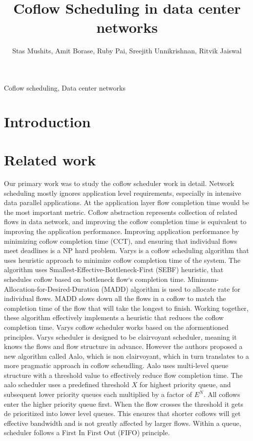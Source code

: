 \documentclass[conference]{IEEEtran}
\title{Coflow Scheduling in data center networks}
\begin{document}
\author{ Stas Mushits, Amit Borase, Ruby Pai, Sreejith Unnikrishnan, Ritvik Jaiswal }

\maketitle


\begin{abstract}
\blindtext[1]
\end{abstract}

\begin{IEEEkeywords}
Coflow scheduling, Data center networks
\end{IEEEkeywords}

\section{Introduction}


\section{Related work}

Our primary work was to study the coflow scheduler work in detail. Network scheduling mostly ignores application level requirements, especially in intensive data parallel applications. At the application layer flow completion time would be the most important metric. Coflow abstraction represents collection of related flows in data network, and improving the coflow completion time is equivalent to improving the application performance. Improving application performance by minimizing coflow completion time (CCT), and ensuring that individual flows meet deadlines is a NP hard problem. Varys is a coflow scheduling algorithm that uses heuristic approach to minimize coflow completion time of the system. The algorithm uses Smallest-Effective-Bottleneck-First (SEBF) heuristic, that schedules coflow based on bottleneck flow`s completion time. Minimum-Allocation-for-Desired-Duration (MADD) algorithm is used to allocate rate for individual flows. MADD slows down all the flows in a coflow to match the completion time of the flow that will take the longest to finish. Working together, these algorithm effectively implements a heuristic that reduces the coflow completion time. Varys coflow scheduler works based on the aformentioned principles. Varys scheduler is designed to be clairvoyant scheduler, meaning it knows the flows and flow structure in advance. However the authors proposed a new algorithm called Aalo, which is non clairvoyant, which in turn translates to a more pragmatic approach in coflow scheudling. Aalo uses multi-level queue structure with a threshold value to effectively reduce flow completion time. The aalo scheduler uses a predefined threshold \(X\) for highest priority queue, and subsequent lower priority queues each multiplied by a factor of \(E^N\). All coflows enter the higher priority queue first. When the flow crosses the threshold it gets de prioritized into lower level queues. This ensures that shorter coflows will get effective bandwidth and is not greatly affected by larger flows. Within a queue, scheduler follows a First In First Out (FIFO) principle.
\end{document}
